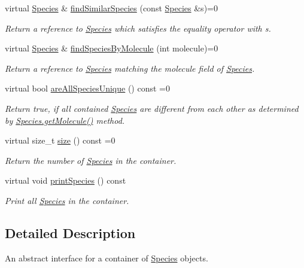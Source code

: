 \begin{DoxyCompactItemize}
virtual \hyperlink{classSpecies}{Species} \& \hyperlink{classSpeciesContainerIFace_a529a00b8ece0bede0e94e0c150579166}{find\+Similar\+Species} (const \hyperlink{classSpecies}{Species} \&s)=0
\begin{DoxyCompactList}\small\item\em Return a reference to \hyperlink{classSpecies}{Species} which satisfies the equality operator with s. \end{DoxyCompactList}\item 
virtual \hyperlink{classSpecies}{Species} \& \hyperlink{classSpeciesContainerIFace_a3c683e11b4af6e3fbd280a5aa027002e}{find\+Species\+By\+Molecule} (int molecule)=0
\begin{DoxyCompactList}\small\item\em Return a reference to \hyperlink{classSpecies}{Species} matching the molecule field of \hyperlink{classSpecies}{Species}. \end{DoxyCompactList}\item 
virtual bool \hyperlink{classSpeciesContainerIFace_a41ad985794a396be719c2615da26e205}{are\+All\+Species\+Unique} () const =0
\begin{DoxyCompactList}\small\item\em Return true, if all contained \hyperlink{classSpecies}{Species} are different from each other as determined by \hyperlink{classSpecies_a1ea8969c51bc69879891a408f9e197c7}{Species.\+get\+Molecule()} method. \end{DoxyCompactList}\item 
virtual size\+\_\+t \hyperlink{classSpeciesContainerIFace_ab9e73c92f995528db474963722929706}{size} () const =0
\begin{DoxyCompactList}\small\item\em Return the number of \hyperlink{classSpecies}{Species} in the container. \end{DoxyCompactList}\item 
virtual void \hyperlink{classSpeciesContainerIFace_a37b4a06dc47eb464124c9a7f688c89ec}{print\+Species} () const 
\begin{DoxyCompactList}\small\item\em Print all \hyperlink{classSpecies}{Species} in the container. \end{DoxyCompactList}\end{DoxyCompactItemize}


\subsection{Detailed Description}
An abstract interface for a container of \hyperlink{classSpecies}{Species} objects. 

